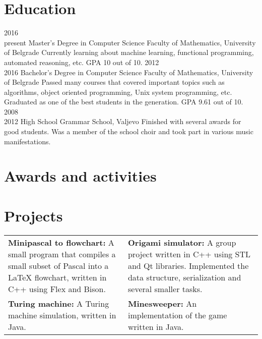\documentclass[a4paper]{my_cv}
\begin{document}
\section{Education}
\begin{entrylist}
  \entry
    {2016~\textemdash \\present}
    {Master's Degree in Computer Science}
    {Faculty of Mathematics, University of Belgrade}
    {Currently learning about machine learning, functional programming, automated reasoning, etc. GPA 10 out of 10.}
  \entry
    {2012~\textemdash \\2016}
    {Bachelor's Degree in Computer Science}
    {Faculty of Mathematics, University of Belgrade}
    {Passed many courses that covered important topics such as algorithms, object oriented programming, Unix system programming, etc. Graduated as one of the best students in the generation. GPA 9.61 out of 10.}
  \entry
    {2008~\textemdash \\2012}
    {High School}
    {Grammar School, Valjevo}
    {Finished with several awards for good students. Was a member of the school choir and took part in various music manifestations.}
\end{entrylist}

\section{Awards and activities}
\bodyfont
\begin{aplist}
\end{aplist}

\section{Projects}
\setlength{\tabcolsep}{6pt}
\begin{tabularx}{1.07\textwidth}{XX}
\textbf{Minipascal to flowchart:} A small program that compiles a small subset of Pascal into a LaTeX flowchart, written in C++ using Flex and Bison. &
\textbf{Origami simulator:} A group project written in C++ using STL and Qt libraries. Implemented the data structure, serialization and several smaller tasks. \\
\textbf{Turing machine:} A Turing machine simulation, written in Java. &
\textbf{Minesweeper:} An implementation of the game written in Java. \\
\end{tabularx}
~
\end{document}
